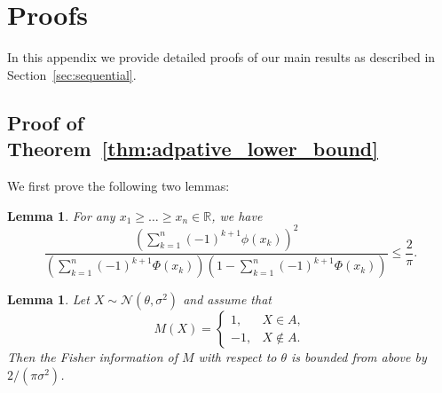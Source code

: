 \documentclass[letterpaper, conference]{IEEEtran}      %
\newtheorem{lem}[thm]{\bf {Lemma}}
\begin{document}
\appendix

\section{Proofs}
In this appendix we provide detailed proofs of our main results as described in Section~\ref{sec:sequential}.

\subsection*{Proof of Theorem~\ref{thm:adpative_lower_bound}}

We first prove the following two lemmas:
\begin{lem} \label{lem:bound_intervals}
For any $x_1 \geq \ldots \geq x_n \in \mathbb R$, we have 
\begin{equation}
\frac{ \left(  \sum_{k=1}^n (-1)^{k+1}\phi(x_k) \right)^2} 
{\left( \sum_{k=1}^n (-1)^{k+1} \Phi(x_k) \right)\left(1- \sum_{k=1}^n (-1)^{k+1} \Phi(x_k) \right)  } \leq \frac{2} {\pi}. \label{eq:bound_intervals}
\end{equation}
\end{lem}
\begin{lem} \label{lem:fisher_bound}
Let $X\sim \mathcal N(\theta,\sigma^2)$ and assume that 
\[
M(X) = \begin{cases} 1,& X \in A, \\
-1, & X \notin A.
\end{cases}
\]
Then the Fisher information of $M$ with respect to $\theta$ is bounded from above by $2/(\pi \sigma^2)$.
\end{lem}
\end{document}

